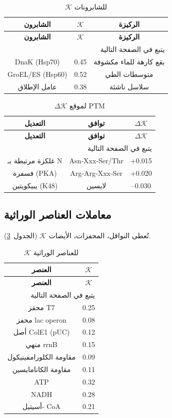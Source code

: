 \documentclass[11pt,a4paper]{article}
\newcommand{\REL}{\mathcal{K}}
\begin{document}
	\begin{longtable}{|c|c|c|}
		\caption{\(\REL\) للشابرونات}\label{tab:chaperones}\\
		\hline
		\textbf{الشابرون} & \(\REL\) & \textbf{الركيزة} \\
		\hline
		\endfirsthead
		\hline
		\textbf{الشابرون} & \(\REL\) & \textbf{الركيزة} \\
		\hline
		\endhead
		\hline
		\multicolumn{3}{r}{يتبع في الصفحة التالية}\\
		\endfoot
		\hline
		\endlastfoot
		DnaK (Hsp70) & 0.45 & بقع كارهة للماء مكشوفة \\
		GroEL/ES (Hsp60) & 0.52 & متوسطات الطي \\
		عامل الإطلاق & 0.38 & سلاسل ناشئة \\
		\hline
	\end{longtable}
	
	\begin{longtable}{|c|c|c|}
		\caption{\(\Delta \REL\) لموقع PTM}\label{tab:ptm}\\
		\hline
		\textbf{التعديل} & \textbf{توافق} & \(\Delta \REL\) \\
		\hline
		\endfirsthead
		\hline
		\textbf{التعديل} & \textbf{توافق} & \(\Delta \REL\) \\
		\hline
		\endhead
		\hline
		\multicolumn{3}{r}{يتبع في الصفحة التالية}\\
		\endfoot
		\hline
		\endlastfoot
		غلكزة مرتبطة بـ N & Asn‑Xxx‑Ser/Thr & +0.015 \\
		فسفرة (PKA) & Arg‑Arg‑Xxx‑Ser & +0.020 \\
		يبيكويتين (K48) & لايسين & –0.030 \\
		\hline
	\end{longtable}
	
	\subsection{معاملات العناصر الوراثية}
	تُعطى النواقل، المحفزات، الأيضات \(\REL\) (الجدول~\ref{tab:elements}).
	
	\begin{longtable}{|c|c|}
		\caption{\(\REL\) للعناصر الوراثية}\label{tab:elements}\\
		\hline
		\textbf{العنصر} & \(\REL\) \\
		\hline
		\endfirsthead
		\hline
		\textbf{العنصر} & \(\REL\) \\
		\hline
		\endhead
		\hline
		\multicolumn{2}{r}{يتبع في الصفحة التالية}\\
		\endfoot
		\hline
		\endlastfoot
		محفز T7 & 0.25 \\
		محفز lac operon & 0.08 \\
		أصل ColE1 (pUC) & 0.12 \\
		منهي rrnB & 0.15 \\
		مقاومة الكلورامفينيكول & 0.09 \\
		مقاومة الكانامايسين & 0.11 \\
		ATP & 0.32 \\
		NADH & 0.28 \\
		أسيتيل- CoA & 0.21 \\
		\hline
	\end{longtable}
	
\end{document}
